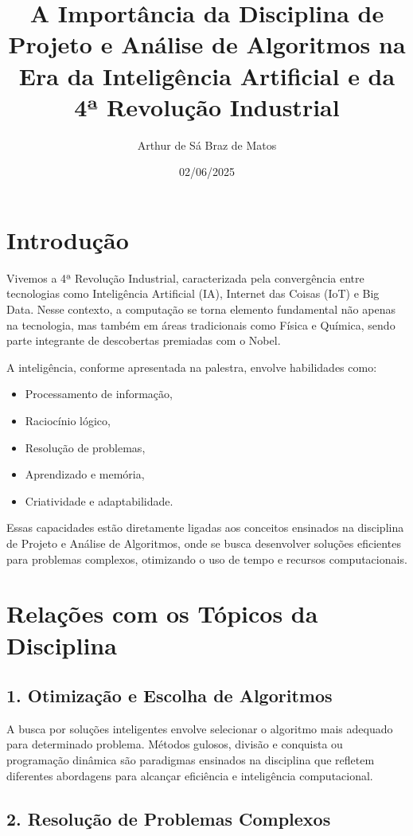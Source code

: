 \documentclass[12pt]{article}
\title{A Importância da Disciplina de Projeto e Análise de Algoritmos na Era da Inteligência Artificial e da 4ª Revolução Industrial}
\author{Arthur de Sá Braz de Matos}
\date{02/06/2025}
\begin{document}
\maketitle

\section*{Introdução}

Vivemos a 4ª Revolução Industrial, caracterizada pela convergência entre tecnologias como Inteligência Artificial (IA), Internet das Coisas (IoT) e Big Data. Nesse contexto, a computação se torna elemento fundamental não apenas na tecnologia, mas também em áreas tradicionais como Física e Química, sendo parte integrante de descobertas premiadas com o Nobel.

A inteligência, conforme apresentada na palestra, envolve habilidades como:
\begin{itemize}
    \item Processamento de informação,
    \item Raciocínio lógico,
    \item Resolução de problemas,
    \item Aprendizado e memória,
    \item Criatividade e adaptabilidade.
\end{itemize}

Essas capacidades estão diretamente ligadas aos conceitos ensinados na disciplina de Projeto e Análise de Algoritmos, onde se busca desenvolver soluções eficientes para problemas complexos, otimizando o uso de tempo e recursos computacionais.

\section*{Relações com os Tópicos da Disciplina}

\subsection*{1. Otimização e Escolha de Algoritmos}

A busca por soluções inteligentes envolve selecionar o algoritmo mais adequado para determinado problema. Métodos gulosos, divisão e conquista ou programação dinâmica são paradigmas ensinados na disciplina que refletem diferentes abordagens para alcançar eficiência e inteligência computacional.

\subsection*{2. Resolução de Problemas Complexos}
\end{document}
